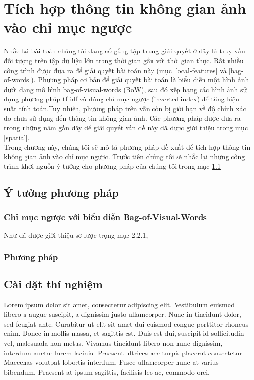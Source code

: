 \chapter{Tích hợp thông tin không gian ảnh vào chỉ mục ngược}
\ifpdf
    \graphicspath{{Chapter3/Chapter3Figs/PNG/}{Chapter3/Chapter3Figs/PDF/}{Chapter3/Chapter3Figs/}}
\else
    \graphicspath{{Chapter3/Chapter3Figs/EPS/}{Chapter3/Chapter3Figs/}}
\fi


Nhắc lại bài toán chúng tôi đang cố gắng tập trung giải quyết ở đây là truy vấn đối tượng trên tập dữ liệu lớn trong thời gian gần với thời gian thực. Rất nhiều công trình được đưa ra để giải quyết bài toán này (mục \ref{local-features} và \ref{bag-of-words}). Phương pháp cơ bản để giải quyết bài toán là biểu diễn một hình ảnh dưới dạng mô hình bag-of-visual-words (BoW), sau đó xếp hạng các hình ảnh sử dụng phương pháp tf-idf và dùng chỉ mục ngược (inverted index) để tăng hiệu suất tính toán.Tuy nhiên, phương pháp trên vẫn còn bị giới hạn về độ chính xác do chưa sử dụng đến thông tin không gian ảnh. Các phương pháp được đưa ra trong những năm gần đây để giải quyết vấn đề này đã được giới thiệu trong mục \ref{spatial}.\\
Trong chương này, chúng tôi sẽ mô tả phương pháp đề xuất để tích hợp thông tin không gian ảnh vào chỉ mục ngược. Trước tiên chúng tôi sẽ nhắc lại những công trình khơi nguồn ý tưởng cho phương pháp của chúng tôi trong mục \ref{idea}

\section{Ý tưởng phương pháp}
\label{idea}

\subsection{Chỉ mục ngược với biểu diễn Bag-of-Visual-Words}
Như đã được giới thiệu sơ lược trọng mục 2.2.1, 


\subsection{Phương pháp}
\label{experiment}

\section{Cài đặt thí nghiệm}
Lorem ipsum dolor sit amet, consectetur adipiscing elit. Vestibulum euismod libero a augue suscipit, a dignissim justo ullamcorper. Nunc in tincidunt dolor, sed feugiat ante. Curabitur ut elit sit amet dui euismod congue porttitor rhoncus enim. Donec in mollis massa, et sagittis est. Duis est dui, suscipit id sollicitudin vel, malesuada non metus. Vivamus tincidunt libero non nunc dignissim, interdum auctor lorem lacinia. Praesent ultrices nec turpis placerat consectetur. Maecenas volutpat lobortis interdum. Fusce ullamcorper nunc at varius bibendum. Praesent at ipsum sagittis, facilisis leo ac, commodo orci.


